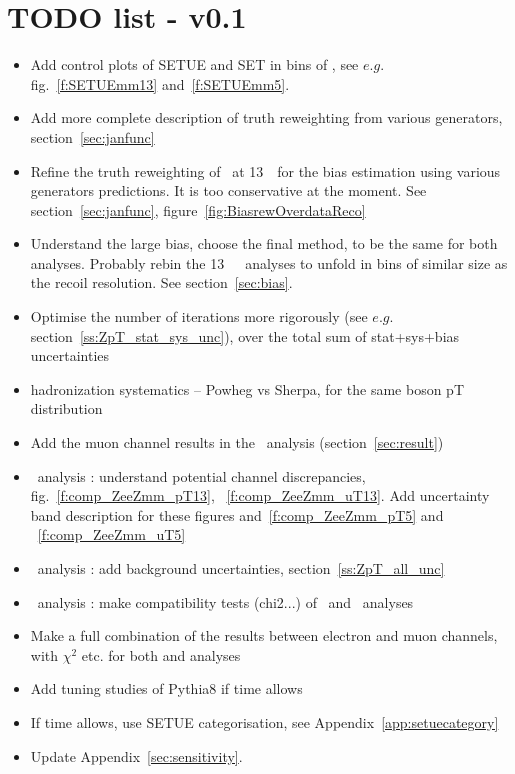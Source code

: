 \section*{TODO list - v0.1}

\begin{itemize}
\item Add control plots of SETUE and SET in bins of \ut, see $e.g.$ fig.~\ref{f:SETUEmm13} and~\ref{f:SETUEmm5}.
\item Add more complete description of truth reweighting from various generators, section~\ref{sec:janfunc}
\item Refine the truth reweighting of \Wplus\ at 13~\TeV\ for the bias estimation using various generators predictions. It is too conservative at the moment. See section~\ref{sec:janfunc}, figure~\ref{fig:BiasrewOverdataReco}
\item Understand the large bias, choose the final method, to be the same for both analyses. Probably rebin the 13~\TeV\ \ut\ analyses to unfold in bins of similar size as the recoil resolution. See section~\ref{sec:bias}.
\item Optimise the number of iterations more rigorously (see $e.g.$ section~\ref{ss:ZpT_stat_sys_unc}), over the total sum of stat+sys+bias uncertainties
\item hadronization systematics -- Powheg vs Sherpa, for the same boson pT distribution
\item Add the muon channel results in the \ptw\ analysis (section~\ref{sec:result})
\item \ptz\ analysis : understand potential channel discrepancies, fig.~\ref{f:comp_ZeeZmm_pT13}, ~\ref{f:comp_ZeeZmm_uT13}. Add uncertainty band description for these figures and~\ref{f:comp_ZeeZmm_pT5} and ~\ref{f:comp_ZeeZmm_uT5}
\item \ptz\ analysis : add background uncertainties, section~\ref{ss:ZpT_all_unc}
\item \ptz\ analysis : make compatibility tests (chi2...) of \ut\ and \ptdilep\ analyses
\item Make a full combination of the results between electron and muon channels, with $\chi^2$ etc. for both \ptz and \ptw analyses
\item Add tuning studies of Pythia8 if time allows
\item If time allows, use SETUE categorisation, see Appendix~\ref{app:setuecategory}
\item Update Appendix~\ref{sec:sensitivity}.
\end{itemize}
